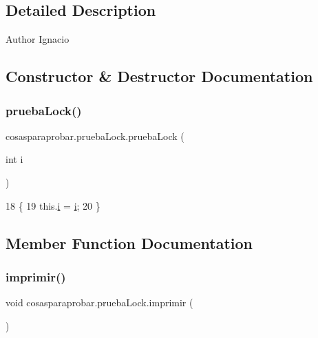 \subsection{Detailed Description}
\begin{DoxyAuthor}{Author}
Ignacio 
\end{DoxyAuthor}


\subsection{Constructor \& Destructor Documentation}
\mbox{\label{classcosasparaprobar_1_1prueba_lock_af5d0c268d078ba0b6d6a8ffec9c6ce26}} 
\subsubsection{\texorpdfstring{prueba\+Lock()}{pruebaLock()}}
{\footnotesize\ttfamily cosasparaprobar.\+prueba\+Lock.\+prueba\+Lock (\begin{DoxyParamCaption}\item[{int}]{i }\end{DoxyParamCaption})\hspace{0.3cm}{\ttfamily [inline]}}


\begin{DoxyCode}
18                              \{
19         this.\mbox{\hyperlink{classcosasparaprobar_1_1prueba_lock_a09994290f41e771d38e58b3fa49a2423}{i}} = \mbox{\hyperlink{classcosasparaprobar_1_1prueba_lock_a09994290f41e771d38e58b3fa49a2423}{i}};
20     \}
\end{DoxyCode}


\subsection{Member Function Documentation}
\mbox{\label{classcosasparaprobar_1_1prueba_lock_aec34354c84889e047b1c06ed12cdebe8}} 
\subsubsection{\texorpdfstring{imprimir()}{imprimir()}}
{\footnotesize\ttfamily void cosasparaprobar.\+prueba\+Lock.\+imprimir (\begin{DoxyParamCaption}{ }\end{DoxyParamCaption})\hspace{0.3cm}{\ttfamily [inline]}}


